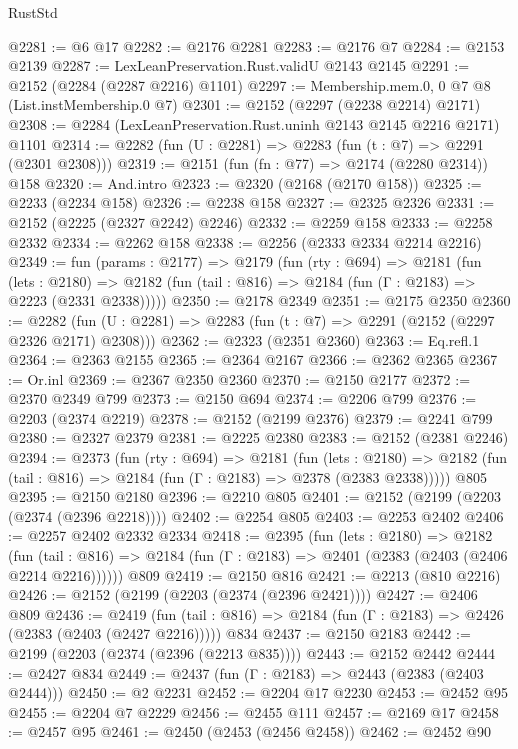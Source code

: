 \begin{lexlean}{RustStd}
\begin{coremodule}
@2281 := @6 @17
@2282 := @2176 @2281
@2283 := @2176 @7
@2284 := @2153 @2139
@2287 := LexLeanPreservation.Rust.validU @2143 @2145
@2291 := @2152 (@2284 (@2287 @2216) @1101)
@2297 := Membership.mem.{0, 0} @7 @8 (List.instMembership.{0} @7)
@2301 := @2152 (@2297 (@2238 @2214) @2171)
@2308 := @2284 (LexLeanPreservation.Rust.uninh @2143 @2145 @2216 @2171) @1101
@2314 := @2282 (fun (U : @2281) => @2283 (fun (t : @7) => @2291 (@2301 @2308)))
@2319 := @2151 (fun (fn : @77) => @2174 (@2280 @2314)) @158
@2320 := And.intro
@2323 := @2320 (@2168 (@2170 @158))
@2325 := @2233 (@2234 @158)
@2326 := @2238 @158
@2327 := @2325 @2326
@2331 := @2152 (@2225 (@2327 @2242) @2246)
@2332 := @2259 @158
@2333 := @2258 @2332
@2334 := @2262 @158
@2338 := @2256 (@2333 @2334 @2214 @2216)
@2349 := fun (params : @2177) =>
  @2179
    (fun (rty : @694) =>
    @2181
      (fun (lets : @2180) =>
      @2182 (fun (tail : @816) => @2184 (fun (Γ : @2183) => @2223 (@2331 @2338)))))
@2350 := @2178 @2349
@2351 := @2175 @2350
@2360 := @2282 (fun (U : @2281) => @2283 (fun (t : @7) => @2291 (@2152 (@2297 @2326 @2171) @2308)))
@2362 := @2323 (@2351 @2360)
@2363 := Eq.refl.{1}
@2364 := @2363 @2155
@2365 := @2364 @2167
@2366 := @2362 @2365
@2367 := Or.inl
@2369 := @2367 @2350 @2360
@2370 := @2150 @2177
@2372 := @2370 @2349 @799
@2373 := @2150 @694
@2374 := @2206 @799
@2376 := @2203 (@2374 @2219)
@2378 := @2152 (@2199 @2376)
@2379 := @2241 @799
@2380 := @2327 @2379
@2381 := @2225 @2380
@2383 := @2152 (@2381 @2246)
@2394 := @2373
    (fun (rty : @694) =>
    @2181
      (fun (lets : @2180) =>
      @2182 (fun (tail : @816) => @2184 (fun (Γ : @2183) => @2378 (@2383 @2338)))))
    @805
@2395 := @2150 @2180
@2396 := @2210 @805
@2401 := @2152 (@2199 (@2203 (@2374 (@2396 @2218))))
@2402 := @2254 @805
@2403 := @2253 @2402
@2406 := @2257 @2402 @2332 @2334
@2418 := @2395
    (fun (lets : @2180) =>
    @2182
      (fun (tail : @816) => @2184 (fun (Γ : @2183) => @2401 (@2383 (@2403 (@2406 @2214 @2216))))))
    @809
@2419 := @2150 @816
@2421 := @2213 (@810 @2216)
@2426 := @2152 (@2199 (@2203 (@2374 (@2396 @2421))))
@2427 := @2406 @809
@2436 := @2419
    (fun (tail : @816) => @2184 (fun (Γ : @2183) => @2426 (@2383 (@2403 (@2427 @2216)))))
    @834
@2437 := @2150 @2183
@2442 := @2199 (@2203 (@2374 (@2396 (@2213 @835))))
@2443 := @2152 @2442
@2444 := @2427 @834
@2449 := @2437 (fun (Γ : @2183) => @2443 (@2383 (@2403 @2444)))
@2450 := @2 @2231
@2452 := @2204 @17 @2230
@2453 := @2452 @95
@2455 := @2204 @7 @2229
@2456 := @2455 @111
@2457 := @2169 @17
@2458 := @2457 @95
@2461 := @2450 (@2453 (@2456 @2458))
@2462 := @2452 @90

\end{coremodule}
\end{lexlean}
